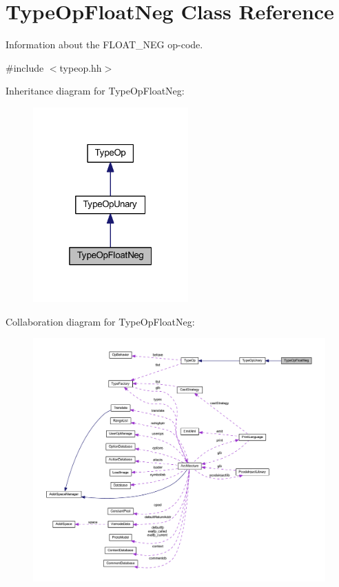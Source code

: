 \hypertarget{class_type_op_float_neg}{}\section{Type\+Op\+Float\+Neg Class Reference}
\label{class_type_op_float_neg}


Information about the F\+L\+O\+A\+T\+\_\+\+N\+EG op-\/code.  




{\ttfamily \#include $<$typeop.\+hh$>$}



Inheritance diagram for Type\+Op\+Float\+Neg\+:
\nopagebreak
\begin{figure}[H]
\begin{center}
\leavevmode
\includegraphics[width=169pt]{class_type_op_float_neg__inherit__graph}
\end{center}
\end{figure}


Collaboration diagram for Type\+Op\+Float\+Neg\+:
\nopagebreak
\begin{figure}[H]
\begin{center}
\leavevmode
\includegraphics[width=350pt]{class_type_op_float_neg__coll__graph}
\end{center}
\end{figure}
